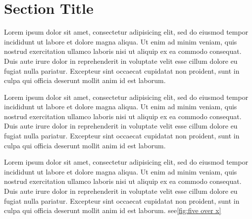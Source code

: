 \section{Section Title}
Lorem ipsum dolor sit amet, consectetur adipisicing elit, sed do eiusmod tempor incididunt ut labore et dolore magna aliqua. Ut enim ad minim veniam, quis nostrud exercitation ullamco laboris nisi ut aliquip ex ea commodo consequat. Duis aute irure dolor in reprehenderit in voluptate velit esse cillum dolore eu fugiat nulla pariatur. Excepteur sint occaecat cupidatat non proident, sunt in culpa qui officia deserunt mollit anim id est laborum.


Lorem ipsum dolor sit amet, consectetur adipisicing elit, sed do eiusmod tempor incididunt ut labore et dolore magna aliqua. Ut enim ad minim veniam, quis nostrud exercitation ullamco laboris nisi ut aliquip ex ea commodo consequat. Duis aute irure dolor in reprehenderit in voluptate velit esse cillum dolore eu fugiat nulla pariatur. Excepteur sint occaecat cupidatat non proident, sunt in culpa qui officia deserunt mollit anim id est laborum.

Lorem ipsum dolor sit amet, consectetur adipisicing elit, sed do eiusmod tempor incididunt ut labore et dolore magna aliqua. Ut enim ad minim veniam, quis nostrud exercitation ullamco laboris nisi ut aliquip ex ea commodo consequat. Duis aute irure dolor in reprehenderit in voluptate velit esse cillum dolore eu fugiat nulla pariatur. Excepteur sint occaecat cupidatat non proident, sunt in culpa qui officia deserunt mollit anim id est laborum.
see\ref{fig:five over x}

